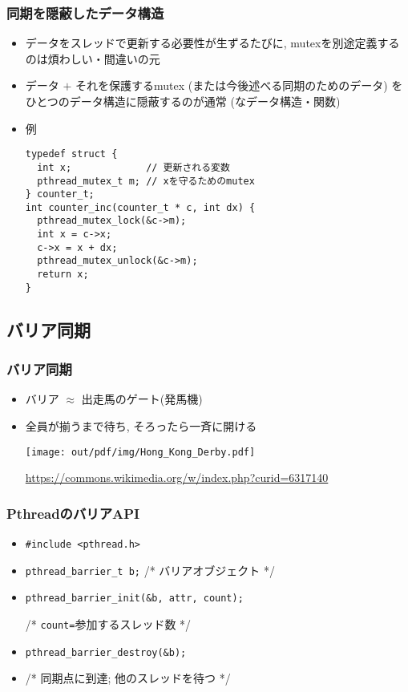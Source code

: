 \documentclass[12pt,dvipdfmx]{beamer}
\begin{document}
\begin{frame}[fragile]
  \frametitle{同期を隠蔽したデータ構造}
  \begin{itemize}
  \item データをスレッドで更新する必要性が生ずるたびに,
    mutexを別途定義するのは煩わしい・間違いの元
  \item データ $+$ それを保護するmutex (または今後述べる同期のためのデータ)
    をひとつのデータ構造に隠蔽するのが通常
    (なデータ構造・関数)
  \item 例
\begin{lstlisting}
typedef struct {
  int x;             // 更新される変数
  pthread_mutex_t m; // xを守るためのmutex
} counter_t;
int counter_inc(counter_t * c, int dx) {
  pthread_mutex_lock(&c->m);
  int x = c->x;
  c->x = x + dx;
  pthread_mutex_unlock(&c->m);
  return x;
}
\end{lstlisting}
\end{itemize}
\end{frame}

\subsection{バリア同期}
\begin{frame}
  \frametitle{バリア同期}
  \begin{itemize}
  \item バリア $\approx$ 出走馬のゲート(発馬機)
  \item 全員が揃うまで待ち, そろったら一斉に開ける
    \begin{center}
\texttt{[image: out/pdf/img/Hong\_Kong\_Derby.pdf]}

{\tiny\url{https://commons.wikimedia.org/w/index.php?curid=6317140}}
\end{center}
\end{itemize}
\end{frame}

\begin{frame}
  \frametitle{PthreadのバリアAPI}
  \begin{itemize}
  \item {\tt \#include <pthread.h>}
  \item {\tt pthread\_barrier\_t b;}  /* バリアオブジェクト */
  \item {\tt pthread\_barrier\_init(\&b, attr, count);}

    /* {\tt count=}参加するスレッド数 */
  \item {\tt pthread\_barrier\_destroy(\&b);}
  \item {}

    /* 同期点に到達; 他のスレッドを待つ */
  \end{itemize}
\end{frame}
\end{document}
